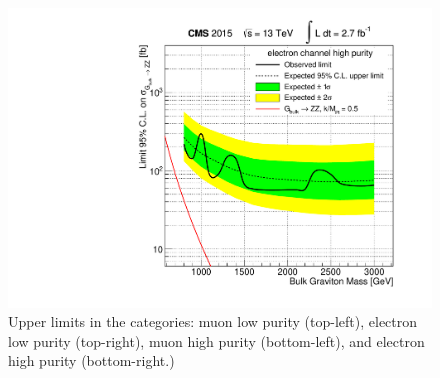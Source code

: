 \begin{figure}[h]
\includegraphics[scale=0.37]{figures/limits/limitEHP.pdf}
\caption[Upper limits per category]{Upper limits in the categories: muon low purity (top-left), electron low purity (top-right), muon high purity (bottom-left), and electron high purity (bottom-right.)}
\label{limits_VZ}
\end{figure}

